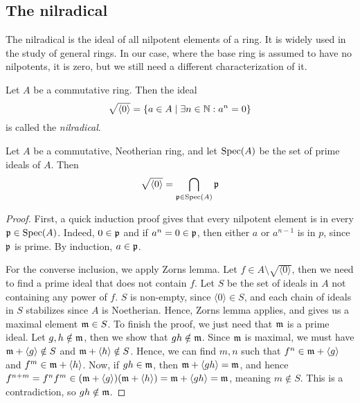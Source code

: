 \subsection{The nilradical}
The nilradical is the ideal of all nilpotent elements of a ring. It is widely used in the study of general rings. In our case, where the base ring is assumed to have no nilpotents, it is zero, but we still need a different characterization of it.

\begin{definition}[Nilradical]
  Let $A$ be a commutative ring. Then the ideal \[\sqrt{\langle 0 \rangle} = \{a \in A \mid \exists n \in \mathbb{N} : a^{n} = 0\}\] is called the \textit{nilradical}.
\end{definition}

\begin{theorem}\label{thm:nil_rad_is_cap_primes}
  Let $A$ be a commutative, Neotherian ring, and let $\operatorname{Spec}(A)$ be the set of prime ideals of $A$. Then
  \[\sqrt{\langle 0 \rangle} = \bigcap_{\mathfrak p \in \operatorname{Spec}(A)} \mathfrak p\]
\end{theorem}
\begin{proof}
  First, a quick induction proof gives that every nilpotent element is in every $\mathfrak p \in \operatorname{Spec}(A)$. Indeed, $0 \in \mathfrak p$ and if $a^{n} = 0 \in \mathfrak p$, then either $a$ or $a^{n-1}$ is in $p$, since $\mathfrak p$ is prime. By induction, $a \in \mathfrak p$.

  For the converse inclusion, we apply Zorns lemma. Let $f \in A \setminus \sqrt{\langle 0 \rangle}$, then we need to find a prime ideal that does not contain $f$. Let $S$ be the set of ideals in $A$ not containing any power of $f$. $S$ is non-empty, since $\langle 0 \rangle \in S$, and each chain of ideals in $S$ stabilizes since $A$ is Noetherian. Hence, Zorns lemma applies, and gives us a maximal element $\mathfrak{m} \in S$. To finish the proof, we just need that $\mathfrak{m}$ is a prime ideal. Let $g, h \notin \mathfrak{m}$, then we show that $g h \notin \mathfrak{m}$. Since $\mathfrak{m}$ is maximal, we must have $\mathfrak{m} + \langle g \rangle \notin S$ and $\mathfrak{m} + \langle h \rangle \notin S$. Hence, we can find $m, n$ such that $f^{n} \in \mathfrak{m} + \langle g \rangle$ and $f^{m} \in \mathfrak{m} + \langle h \rangle$. Now, if $g h \in \mathfrak{m}$, then $\mathfrak{m} + \langle g h \rangle = \mathfrak{m}$, and hence $f^{n + m} = f^{n} f^{m} \in (\mathfrak{m} + \langle g \rangle)(\mathfrak{m} + \langle h \rangle) = \mathfrak{m} + \langle g h \rangle = \mathfrak{m}$, meaning $m \notin S$. This is a contradiction, so $g h \notin \mathfrak{m}$.
\end{proof}




